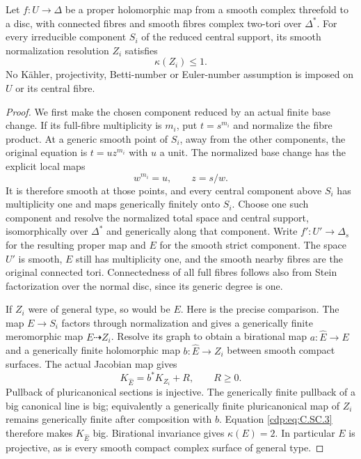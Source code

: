 
\begin{proposition}\label{cdp:st:C.2.UN.15}
Let $f:U\to\Delta$ be a proper holomorphic map from
a smooth complex threefold to a disc, with connected
fibres and smooth fibres complex two-tori over
$\Delta^*$. For every irreducible component $S_i$
of the reduced central support, its smooth
normalization resolution $Z_i$ satisfies
\[
                            \kappa(Z_i)\le1.
 \tag{C.SC.1}\label{cdp:eq:C.SC.1}
\]
No K\"ahler, projectivity, Betti-number or Euler-number
assumption is imposed on $U$ or its central fibre.
\end{proposition}
\begin{proof}
We first make the chosen component reduced by an
actual finite base change. If its full-fibre
multiplicity is $m_i$, put $t=s^{m_i}$ and normalize
the fibre product. At a generic smooth point of
$S_i$, away from the other components, the original
equation is $t=u z^{m_i}$ with $u$ a unit. The
normalized base change has the explicit local maps
\[
                  w^{m_i}=u,\qquad z=s/w.
 \tag{C.SC.2}\label{cdp:eq:C.SC.2}
\]
It is therefore smooth at those points, and every
central component above $S_i$ has multiplicity one
and maps generically finitely onto $S_i$. Choose one
such component and resolve the normalized total
space and central support, isomorphically over
$\Delta^*$ and generically along that component.
Write $f':U'\to\Delta_s$ for the resulting proper
map and $E$ for the smooth strict component. The
space $U'$ is smooth, $E$ still has multiplicity
one, and the smooth nearby fibres are the original
connected tori. Connectedness of all full fibres
follows also from Stein factorization over the
normal disc, since its generic degree is one.

If $Z_i$ were of general type, so would be $E$.
Here is the precise comparison. The map $E\to S_i$
factors through normalization and gives a
generically finite meromorphic map $E\dashrightarrow
Z_i$. Resolve its graph to obtain a birational
map $a:\widehat E\to E$ and a generically finite
holomorphic map $b:\widehat E\to Z_i$ between
smooth compact surfaces. The actual Jacobian map
gives
\[
                 K_{\widehat E}=b^*K_{Z_i}+R,
                 \qquad R\ge0.                 \tag{C.SC.3}\label{cdp:eq:C.SC.3}
\]
Pullback of pluricanonical sections is injective.
The generically finite pullback of a big canonical
line is big; equivalently a generically finite
pluricanonical map of $Z_i$ remains generically
finite after composition with $b$. Equation
\eqref{cdp:eq:C.SC.3} therefore makes $K_{\widehat E}$ big.
Birational invariance gives $\kappa(E)=2$.
In particular $E$ is projective, as is every
smooth compact complex surface of general type.


\end{proof}

